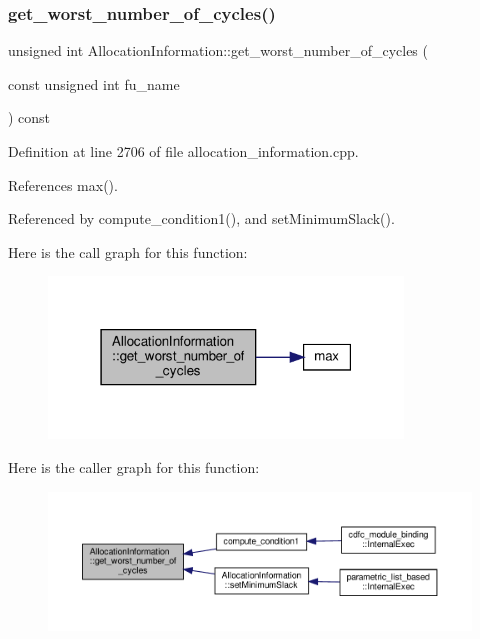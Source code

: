 \subsubsection{\texorpdfstring{get\+\_\+worst\+\_\+number\+\_\+of\+\_\+cycles()}{get\_worst\_number\_of\_cycles()}}
{\footnotesize\ttfamily unsigned int Allocation\+Information\+::get\+\_\+worst\+\_\+number\+\_\+of\+\_\+cycles (\begin{DoxyParamCaption}\item[{const unsigned int}]{fu\+\_\+name }\end{DoxyParamCaption}) const}



Definition at line 2706 of file allocation\+\_\+information.\+cpp.



References max().



Referenced by compute\+\_\+condition1(), and set\+Minimum\+Slack().

Here is the call graph for this function\+:
\nopagebreak
\begin{figure}[H]
\begin{center}
\leavevmode
\includegraphics[width=267pt]{d7/d79/classAllocationInformation_a49fdcc7141cc14a63df2ae3f35dccc7a_cgraph}
\end{center}
\end{figure}
Here is the caller graph for this function\+:
\nopagebreak
\begin{figure}[H]
\begin{center}
\leavevmode
\includegraphics[width=350pt]{d7/d79/classAllocationInformation_a49fdcc7141cc14a63df2ae3f35dccc7a_icgraph}
\end{center}
\end{figure}
\mbox{\label{classAllocationInformation_a86d1df5f0669734901d715e740200c1c}} 
